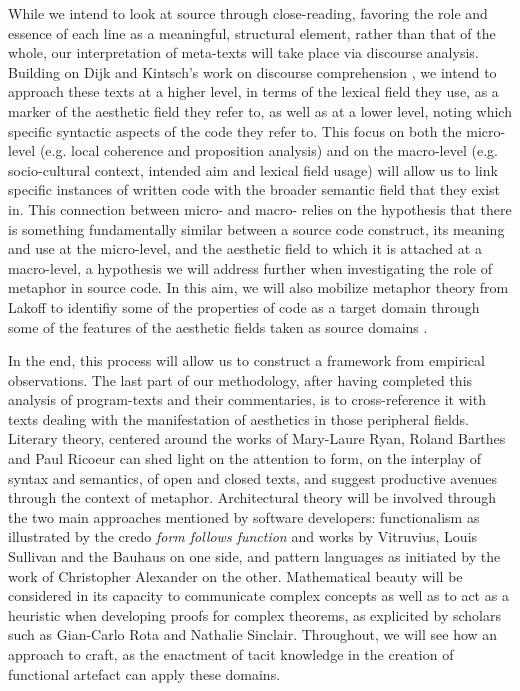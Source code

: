 While we intend to look at source through close-reading, favoring the role and essence of each line as a meaningful, structural element, rather than that of the whole, our interpretation of meta-texts will take place via discourse analysis. Building on Dijk and Kintsch's work on discourse comprehension \citep{dijk_strategies_1983b}, we intend to approach these texts at a higher level, in terms of the lexical field they use, as a marker of the aesthetic field they refer to, as well as at a lower level, noting which specific syntactic aspects of the code they refer to. This focus on both the micro-level (e.g. local coherence and proposition analysis) and on the macro-level (e.g. socio-cultural context, intended aim and  lexical field usage) will allow us to link specific instances of written code with the broader semantic field that they exist in. This connection between micro- and macro- relies on the hypothesis that there is something fundamentally similar between a source code construct, its meaning and use at the micro-level, and the aesthetic field to which it is attached at a macro-level, a hypothesis we will address further when investigating the role of metaphor in source code. In this aim, we will also mobilize metaphor theory from Lakoff to identifiy some of the properties of code as a target domain through some of the features of the aesthetic fields taken as source domains \citep{lakoff_metaphors_1980}.

In the end, this process will allow us to construct a framework from empirical observations. The last part of our methodology, after having completed this analysis of program-texts and their commentaries, is to cross-reference it with texts dealing with the manifestation of aesthetics in those peripheral fields. Literary theory, centered around the works of Mary-Laure Ryan, Roland Barthes and Paul Ricoeur can shed light on the attention to form, on the interplay of syntax and semantics, of open and closed texts, and suggest productive avenues through the context of metaphor. Architectural theory will be involved through the two main approaches mentioned by software developers: functionalism as illustrated by the credo \emph{form follows function} and works by Vitruvius, Louis Sullivan and the Bauhaus on one side, and pattern languages as initiated by the work of Christopher Alexander on the other. Mathematical beauty will be considered in its capacity to communicate complex concepts as well as to act as a heuristic when developing proofs for complex theorems, as explicited by scholars such as Gian-Carlo Rota and Nathalie Sinclair. Throughout, we will see how an approach to craft, as the enactment of tacit knowledge in the creation of functional artefact can apply these domains.

